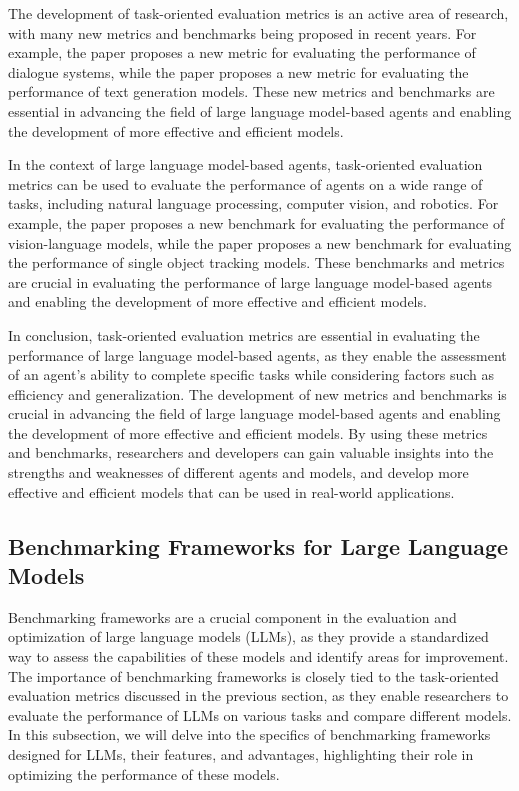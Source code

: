 \documentclass[11pt]{article}
\begin{document}
The development of task-oriented evaluation metrics is an active area of research, with many new metrics and benchmarks being proposed in recent years. For example, the paper \cite{ref194} proposes a new metric for evaluating the performance of dialogue systems, while the paper \cite{ref195} proposes a new metric for evaluating the performance of text generation models. These new metrics and benchmarks are essential in advancing the field of large language model-based agents and enabling the development of more effective and efficient models.

In the context of large language model-based agents, task-oriented evaluation metrics can be used to evaluate the performance of agents on a wide range of tasks, including natural language processing, computer vision, and robotics. For example, the paper \cite{ref196} proposes a new benchmark for evaluating the performance of vision-language models, while the paper \cite{ref197} proposes a new benchmark for evaluating the performance of single object tracking models. These benchmarks and metrics are crucial in evaluating the performance of large language model-based agents and enabling the development of more effective and efficient models.

In conclusion, task-oriented evaluation metrics are essential in evaluating the performance of large language model-based agents, as they enable the assessment of an agent's ability to complete specific tasks while considering factors such as efficiency and generalization. The development of new metrics and benchmarks is crucial in advancing the field of large language model-based agents and enabling the development of more effective and efficient models. By using these metrics and benchmarks, researchers and developers can gain valuable insights into the strengths and weaknesses of different agents and models, and develop more effective and efficient models that can be used in real-world applications.

\subsection{Benchmarking Frameworks for Large Language Models}

Benchmarking frameworks are a crucial component in the evaluation and optimization of large language models (LLMs), as they provide a standardized way to assess the capabilities of these models and identify areas for improvement. The importance of benchmarking frameworks is closely tied to the task-oriented evaluation metrics discussed in the previous section, as they enable researchers to evaluate the performance of LLMs on various tasks and compare different models. In this subsection, we will delve into the specifics of benchmarking frameworks designed for LLMs, their features, and advantages, highlighting their role in optimizing the performance of these models.
\end{document}
